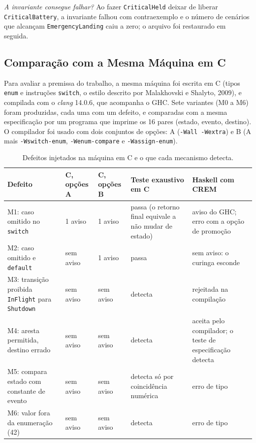 \documentclass[12pt,a4paper]{article}
\begin{document}
\textit{A invariante consegue falhar?} Ao fazer \texttt{CriticalHeld} deixar de liberar \texttt{CriticalBattery}, a invariante falhou com contraexemplo e o número de cenários que alcançam \texttt{EmergencyLanding} caiu a zero; o arquivo foi restaurado em seguida.

\subsection{Comparação com a Mesma Máquina em C}

Para avaliar a premissa do trabalho, a mesma máquina foi escrita em C (tipos \texttt{enum} e instruções \texttt{switch}, o estilo descrito por Malakhovski e Shalyto, 2009), e compilada com o \textit{clang} 14.0.6, que acompanha o GHC. Sete variantes (M0 a M6) foram produzidas, cada uma com um defeito, e comparadas com a mesma especificação por um programa que imprime os 16 pares (estado, evento, destino). O compilador foi usado com dois conjuntos de opções: A (\texttt{-Wall -Wextra}) e B (A mais \texttt{-Wswitch-enum}, \texttt{-Wenum-compare} e \texttt{-Wassign-enum}).

\begin{table}[h]
\centering
\scriptsize
\begin{tabular}{|p{3.4cm}|p{1.6cm}|p{1.6cm}|p{2.2cm}|p{4.3cm}|}
\hline
Defeito & C, opções A & C, opções B & Teste exaustivo em C & Haskell com CREM \\
\hline
M1: caso omitido no \texttt{switch} & 1 aviso & 1 aviso & passa (o retorno final equivale a não mudar de estado) & aviso do GHC; erro com a opção de promoção \\
\hline
M2: caso omitido e \texttt{default} & sem aviso & 1 aviso & passa & sem aviso: o curinga esconde \\
\hline
M3: transição proibida \texttt{InFlight} para \texttt{Shutdown} & sem aviso & sem aviso & detecta & rejeitada na compilação \\
\hline
M4: aresta permitida, destino errado & sem aviso & sem aviso & detecta & aceita pelo compilador; o teste de especificação detecta \\
\hline
M5: compara estado com constante de evento & sem aviso & sem aviso & detecta só por coincidência numérica & erro de tipo \\
\hline
M6: valor fora da enumeração (42) & sem aviso & sem aviso & detecta & erro de tipo \\
\hline
\end{tabular}
\caption{Defeitos injetados na máquina em C e o que cada mecanismo detecta.}
\end{table}
\end{document}
